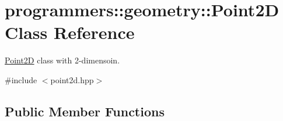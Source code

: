 \hypertarget{classprogrammers_1_1geometry_1_1Point2D}{}\section{programmers\+:\+:geometry\+:\+:Point2D Class Reference}
\label{classprogrammers_1_1geometry_1_1Point2D}


\hyperlink{classprogrammers_1_1geometry_1_1Point2D}{Point2D} class with 2-\/dimensoin.  




{\ttfamily \#include $<$point2d.\+hpp$>$}

\subsection*{Public Member Functions}
